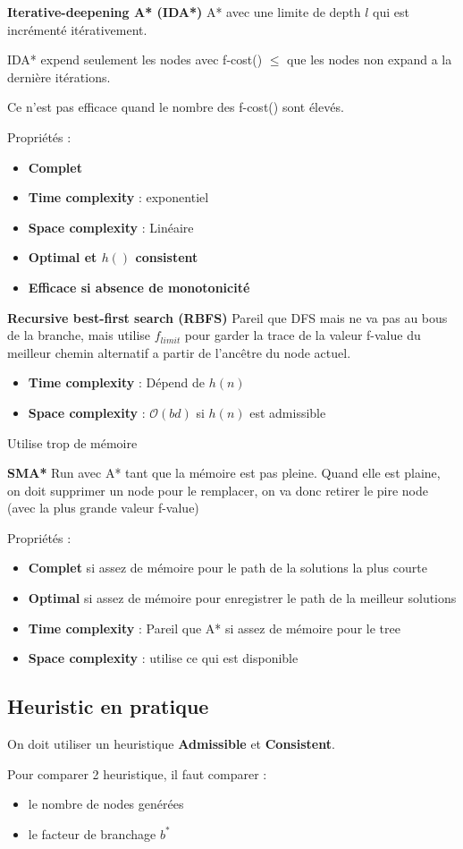 		\textbf{Iterative-deepening A* (IDA*)}
			A* avec une limite de depth $l$ qui est incrémenté itérativement.
			
			IDA* expend seulement les nodes avec f-cost() $\leq$ que les nodes non expand a la dernière itérations.
		
			Ce n'est pas efficace quand le nombre des f-cost() sont élevés.
			
			Propriétés :
			\begin{itemize}
				\item \textbf{Complet}
				\item \textbf{Time complexity} : exponentiel
				\item \textbf{Space complexity} : Linéaire
				\item \textbf{Optimal et $h()$ consistent}
				\item \textbf{Efficace si absence de monotonicité}
			\end{itemize}
			
		\textbf{Recursive best-first search (RBFS)}
			Pareil que DFS mais ne va pas au bous de la branche, mais utilise $f_{limit}$  pour garder la trace de la valeur f-value du meilleur chemin alternatif a partir de l'ancêtre du node actuel.
			
			\begin{itemize}
				\item \textbf{Time complexity} : Dépend de $h(n)$
				\item \textbf{Space complexity} : $\mathcal{O}(bd)$ si $h(n)$ est admissible
			\end{itemize}
			
			Utilise trop de mémoire
		
		\textbf{SMA*}
			Run avec A* tant que la mémoire est pas pleine. Quand elle est plaine, on doit supprimer un node pour le remplacer, on va donc retirer le pire node (avec la plus grande valeur f-value)
		
		Propriétés :
			\begin{itemize}
				\item \textbf{Complet} si assez de mémoire pour le path de la solutions la plus courte
				\item \textbf{Optimal} si assez de mémoire pour enregistrer le path de la meilleur solutions
				\item \textbf{Time complexity} : Pareil que A* si assez de mémoire pour le tree
				\item \textbf{Space complexity} : utilise ce qui est disponible
			\end{itemize}
		
	
	\subsection{Heuristic en pratique}
		On doit utiliser un heuristique \textbf{Admissible} et \textbf{Consistent}.
		
		Pour comparer 2 heuristique, il faut comparer :
		\begin{itemize}
			\item le nombre de nodes genérées
			\item le facteur de branchage $b^*$
		\end{itemize}
		